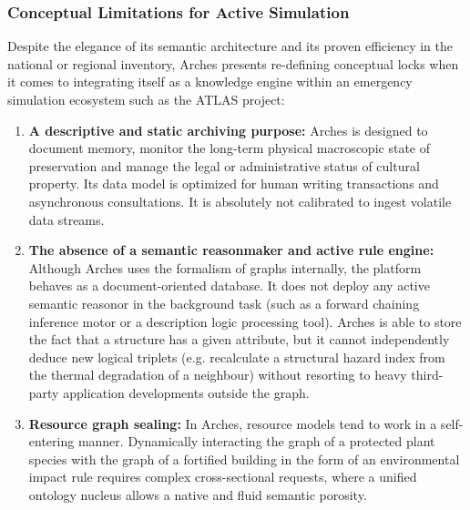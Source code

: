 \documentclass{article}
\begin{document}
\subsubsection{Conceptual Limitations for Active Simulation}

Despite the elegance of its semantic architecture and its proven efficiency in the national or regional inventory, Arches presents re-defining conceptual locks when it comes to integrating itself as a knowledge engine within an emergency simulation ecosystem such as the ATLAS project:

\begin{enumerate}
\item \textbf {A descriptive and static archiving purpose:} Arches is designed to document memory, monitor the long-term physical macroscopic state of preservation and manage the legal or administrative status of cultural property. Its data model is optimized for human writing transactions and asynchronous consultations. It is absolutely not calibrated to ingest volatile data streams.
\item \textbf {The absence of a semantic reasonmaker and active rule engine:} Although Arches uses the formalism of graphs internally, the platform behaves as a document-oriented database. It does not deploy any active semantic reasonor in the background task (such as a forward chaining inference motor or a description logic processing tool). Arches is able to store the fact that a structure has a given attribute, but it cannot independently deduce new logical triplets (e.g. recalculate a structural hazard index from the thermal degradation of a neighbour) without resorting to heavy third-party application developments outside the graph.
\item \textbf {Resource graph sealing:} In Arches, resource models tend to work in a self-entering manner. Dynamically interacting the graph of a protected plant species with the graph of a fortified building in the form of an environmental impact rule requires complex cross-sectional requests, where a unified ontology nucleus allows a native and fluid semantic porosity.
\end{enumerate}
\end{document}
